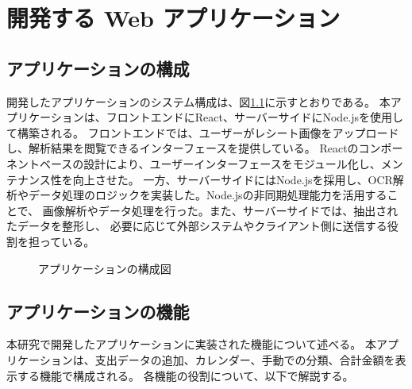 \documentclass[main]{subfiles}
\begin{document}
\chapter{開発する Web アプリケーション}
\label{cha:overview}
\section{アプリケーションの構成}

開発したアプリケーションのシステム構成は、図\ref{fig:system}に示すとおりである。
本アプリケーションは、フロントエンドにReact、サーバーサイドにNode.jsを使用して構築される。
フロントエンドでは、ユーザーがレシート画像をアップロードし、解析結果を閲覧できるインターフェースを提供している。
Reactのコンポーネントベースの設計により、ユーザーインターフェースをモジュール化し、メンテナンス性を向上させた。
一方、サーバーサイドにはNode.jsを採用し、OCR解析やデータ処理のロジックを実装した。Node.jsの非同期処理能力を活用することで、
画像解析やデータ処理を行った。また、サーバーサイドでは、抽出されたデータを整形し、
必要に応じて外部システムやクライアント側に送信する役割を担っている。

\begin{figure}[tb]
    \begin{center}
        \caption{アプリケーションの構成図}
        \label{fig:system}
    \end{center}
\end{figure}

\section{アプリケーションの機能}

本研究で開発したアプリケーションに実装された機能について述べる。
本アプリケーションは、支出データの追加、カレンダー、手動での分類、合計金額を表示する機能で構成される。
各機能の役割について、以下で解説する。

\end{document}

